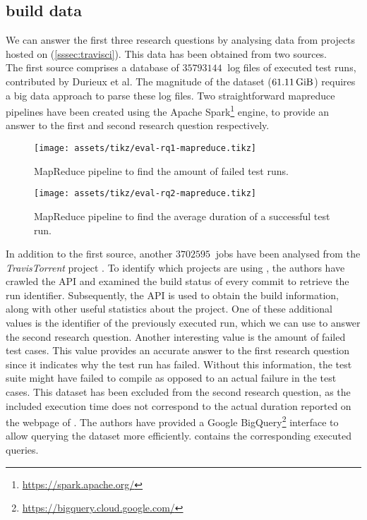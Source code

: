 
\subsection{\travisci{} build data}
We can answer the first three research questions by analysing data from projects hosted on \travisci{} (\cref{sssec:travisci}). This data has been obtained from two sources.\\

\noindent The first source comprises a database \cite{travisanalysis} of $\SI{35793144}{}$ log files of executed test runs, contributed by Durieux et al. The magnitude of the dataset ($\SI{61.11}{\gibi\byte}$) requires a big data approach to parse these log files. Two straightforward \Gls{mapreduce} pipelines have been created using the Apache Spark\footnote{\url{https://spark.apache.org/}} engine, to provide an answer to the first and second research question respectively.\\

\begin{figure}[htbp!]
	\centering
	\texttt{[image: assets/tikz/eval-rq1-mapreduce.tikz]}
	\caption{MapReduce pipeline to find the amount of failed test runs.}
	\label{fig:eval-mapreduce-1}
\end{figure}

\begin{figure}[htbp!]
	\centering
	\texttt{[image: assets/tikz/eval-rq2-mapreduce.tikz]}
	\caption{MapReduce pipeline to find the average duration of a successful test run.}
	\label{fig:eval-mapreduce-2}
\end{figure}

\noindent In addition to the first source, another $\SI{3702595}{}$ jobs have been analysed from the \mbox{\emph{TravisTorrent}} project \cite{msr17challenge}. To identify which projects are using \travisci{}, the authors have crawled the \github{} API and examined the build status of every commit to retrieve the run identifier. Subsequently, the \travisci{} API is used to obtain the build information, along with other useful statistics about the project. One of these additional values is the identifier of the previously executed run, which we can use to answer the second research question. Another interesting value is the amount of failed test cases. This value provides an accurate answer to the first research question since it indicates why the test run has failed. Without this information, the test suite might have failed to compile as opposed to an actual failure in the test cases. This dataset has been excluded from the second research question, as the included execution time does not correspond to the actual duration reported on the webpage of \travisci{}. The authors have provided a Google BigQuery\footnote{\url{https://bigquery.cloud.google.com/}} interface to allow querying the dataset more efficiently.  contains the corresponding executed queries.
